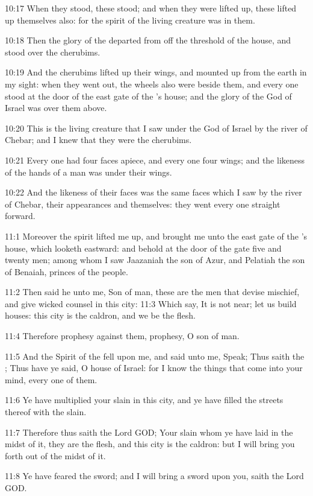 10:17 When they stood, these stood; and when they were lifted up, these lifted up themselves also: for the spirit of the living creature was in them.

10:18 Then the glory of the \LORD departed from off the threshold of the house, and stood over the cherubims.

10:19 And the cherubims lifted up their wings, and mounted up from the earth in my sight: when they went out, the wheels also were beside them, and every one stood at the door of the east gate of the \LORD's house; and the glory of the God of Israel was over them above.

10:20 This is the living creature that I saw under the God of Israel by the river of Chebar; and I knew that they were the cherubims.

10:21 Every one had four faces apiece, and every one four wings; and the likeness of the hands of a man was under their wings.

10:22 And the likeness of their faces was the same faces which I saw by the river of Chebar, their appearances and themselves: they went every one straight forward.

11:1 Moreover the spirit lifted me up, and brought me unto the east gate of the \LORD's house, which looketh eastward: and behold at the door of the gate five and twenty men; among whom I saw Jaazaniah the son of Azur, and Pelatiah the son of Benaiah, princes of the people.

11:2 Then said he unto me, Son of man, these are the men that devise mischief, and give wicked counsel in this city: 11:3 Which say, It is not near; let us build houses: this city is the caldron, and we be the flesh.

11:4 Therefore prophesy against them, prophesy, O son of man.

11:5 And the Spirit of the \LORD fell upon me, and said unto me, Speak; Thus saith the \LORD; Thus have ye said, O house of Israel: for I know the things that come into your mind, every one of them.

11:6 Ye have multiplied your slain in this city, and ye have filled the streets thereof with the slain.

11:7 Therefore thus saith the Lord GOD; Your slain whom ye have laid in the midst of it, they are the flesh, and this city is the caldron: but I will bring you forth out of the midst of it.

11:8 Ye have feared the sword; and I will bring a sword upon you, saith the Lord GOD.

